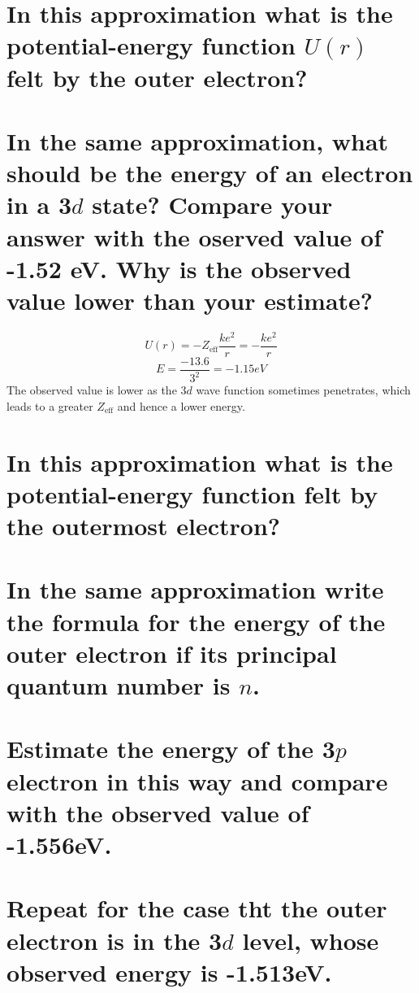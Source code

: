 \documentclass[answers]{exam}
\begin{document}
\begin{questions}
\begin{parts}
	\part{In this approximation what is the potential-energy function $U(r)$ felt by the outer electron?}
	\part{In the same approximation, what should be the energy of an electron in a 3$d$ state? Compare your answer with the oserved value of -1.52 eV. Why is the observed value lower than your estimate?}
\end{parts}

\begin{solution}
	$$U(r) = -Z_{\text{eff}}\frac{ke^2}{r} = -\frac{ke^2}{r}$$
	$$E = \frac{-13.6}{3^2} = -1.15\si{eV}$$
	The observed value is lower as the 3$d$ wave function sometimes penetrates, which leads to a greater $Z_{\text{eff}}$ and hence a lower energy.
\end{solution}


\begin{parts}
	\part{In this approximation what is the potential-energy function felt by the outermost electron?}
	\part{In the same approximation write the formula for the energy of the outer electron if its principal quantum number is $n$.}
	\part{Estimate the energy of the 3$p$ electron in this way and  compare with the observed value of -1.556\si{eV}.}
	\part{Repeat for the case tht the outer electron is in the 3$d$ level, whose observed energy is -1.513\si{eV}.}

\end{parts}
\end{questions}
\end{document}
